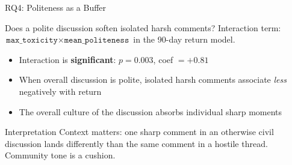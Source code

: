 \documentclass[aspectratio=169,11pt]{beamer}
\begin{document}
\begin{frame}{RQ4: Politeness as a Buffer}
\begin{block}{Does a polite discussion soften isolated harsh comments?}
Interaction term: $\texttt{max\_toxicity} \times \texttt{mean\_politeness}$ in the 90-day return model.
\end{block}

\vspace{0.5em}
\begin{itemize}
  \item Interaction is \textbf{significant}: $p = 0.003$, coef $= +0.81$
  \item When overall discussion is polite, isolated harsh comments associate \emph{less} negatively with return
  \item The overall culture of the discussion absorbs individual sharp moments
\end{itemize}

\vspace{0.5em}
\begin{alertblock}{Interpretation}
Context matters: one sharp comment in an otherwise civil discussion lands differently than the same comment in a hostile thread. Community tone is a cushion.
\end{alertblock}
\end{frame}
\end{document}
